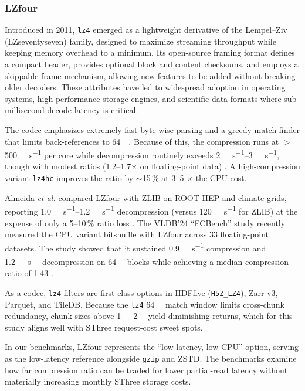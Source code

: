 \documentclass[nomenclature, english, bibtex]{kththesis}
\numberwithin{listing}{chapter}
\begin{document}
\subsubsection{\texorpdfstring{\gls{LZfour}}{LZ4}}
\label{sec:compression-lz4}
Introduced in 2011, \texttt{lz4} emerged as a lightweight derivative of the Lempel–Ziv (\gls{LZseventyseven}) family, designed to maximize streaming throughput while keeping memory overhead to a minimum. Its open-source framing format defines a compact header, provides optional block and content checksums, and employs a skippable frame mechanism, allowing new features to be added without breaking older decoders. These attributes have led to widespread adoption in operating systems, high-performance storage engines, and scientific data formats where sub-millisecond decode latency is critical.

The codec emphasizes extremely fast byte-wise parsing and a greedy match-finder that limits back-references to \SI{64}{\kilo\byte}. Because of this, the compression runs at $>$\SI{500}{\mega\byte\per\second} per core while decompression routinely exceeds \SIrange{2}{3}{\giga\byte\per\second}, though with modest ratios (1.2–1.7\(\times\) on floating-point data) \cite{lz42025,7440278}. A high-compression variant \texttt{lz4hc} improves the ratio by $\sim$15\,\% at 3–5 \(\times\) the \gls{CPU} cost.

Almeida \emph{et al.} compared \gls{LZfour} with \gls{ZLIB} on \gls{ROOT} HEP and climate grids, reporting \SIrange{1.0}{1.2}{\giga\byte\per\second} decompression (versus \SI{120}{\mega\byte\per\second} for \gls{ZLIB}) at the expense of only a 5–10\,\% ratio loss \cite{almeida2014two}. The \gls{VLDB}’24 “\gls{FCBench}” study recently measured the \gls{CPU} variant bitshuffle with \gls{LZfour} across 33 floating-point datasets. The study showed that it sustained \SI{0.9}{\giga\byte\per\second} compression and \SI{1.2}{\giga\byte\per\second} decompression on \SI{64}{\kilo\byte} blocks while achieving a median compression ratio of 1.43 \cite{chen2023fcbench}.

As a codec, \texttt{lz4} filters are first-class options in \gls{HDFfive} (\texttt{H5Z\_LZ4}), Zarr v3, Parquet, and TileDB. Because the \texttt{lz4} \SI{64}{\kilo\byte} match window limits cross-chunk redundancy, chunk sizes above \SIrange{1}{2}{\mega\byte} yield diminishing returns, which for this study aligns well with \gls{SThree} request-cost sweet spots.

In our benchmarks, \gls{LZfour} represents the “low-latency, low-\gls{CPU}” option, serving as the low-latency reference alongside \texttt{gzip} and \gls{ZSTD}. The benchmarks examine how far compression ratio can be traded for lower partial-read latency without materially increasing monthly \gls{SThree} storage costs.
\end{document}
